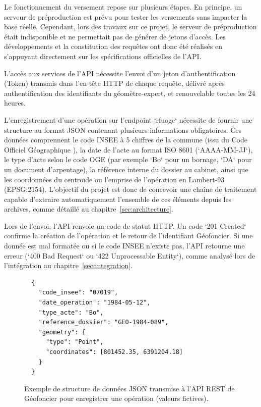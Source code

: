 Le fonctionnement du versement repose sur plusieurs étapes. En principe, un serveur de préproduction est prévu pour tester les versements sans impacter la base réelle. Cependant, lors des travaux sur ce projet, le serveur de préproduction était indisponible et ne permettait pas de générer de jetons d'accès. Les développements et la constitution des requêtes ont donc été réalisés en s'appuyant directement sur les spécifications officielles de l'API.

L'accès aux services de l'API nécessite l'envoi d'un jeton d'authentification (Token) transmis dans l'en-tête HTTP de chaque requête, délivré après authentification des identifiants du géomètre-expert, et renouvelable toutes les 24 heures.

L'enregistrement d'une opération sur l'endpoint `rfuoge` nécessite de fournir une structure au format JSON contenant plusieurs informations obligatoires. Ces données comprennent le code INSEE à 5 chiffres de la commune (issu du Code Officiel Géographique \citep{insee_cog}), la date de l'acte au format ISO 8601 (`AAAA-MM-JJ`), le type d'acte selon le code OGE (par exemple `Bo` pour un bornage, `DA` pour un document d'arpentage), la référence interne du dossier au cabinet, ainsi que les coordonnées du centroïde ou l'emprise de l'opération en Lambert-93 (EPSG:2154). L'objectif du projet est donc de concevoir une chaîne de traitement capable d'extraire automatiquement l'ensemble de ces éléments depuis les archives, comme détaillé au chapitre~\ref{sec:architecture}.

Lors de l'envoi, l'API renvoie un code de statut HTTP. Un code `201 Created` confirme la création de l'opération et le retour de l'identifiant Géofoncier. Si une donnée est mal formatée ou si le code INSEE n'existe pas, l'API retourne une erreur (`400 Bad Request` ou `422 Unprocessable Entity`), comme analysé lors de l'intégration au chapitre~\ref{sec:integration}.



\begin{figure}[H]
  \centering
  \begin{verbatim}
  {
    "code_insee": "07019",
    "date_operation": "1984-05-12",
    "type_acte": "Bo",
    "reference_dossier": "GEO-1984-089",
    "geometry": {
      "type": "Point",
      "coordinates": [801452.35, 6391204.18]
    }
  }
  \end{verbatim}
  \caption{Exemple de structure de données JSON transmise à l'API REST de Géofoncier pour enregistrer une opération (valeurs fictives).}
  \label{fig:payload_json_geofoncier}
\end{figure}

